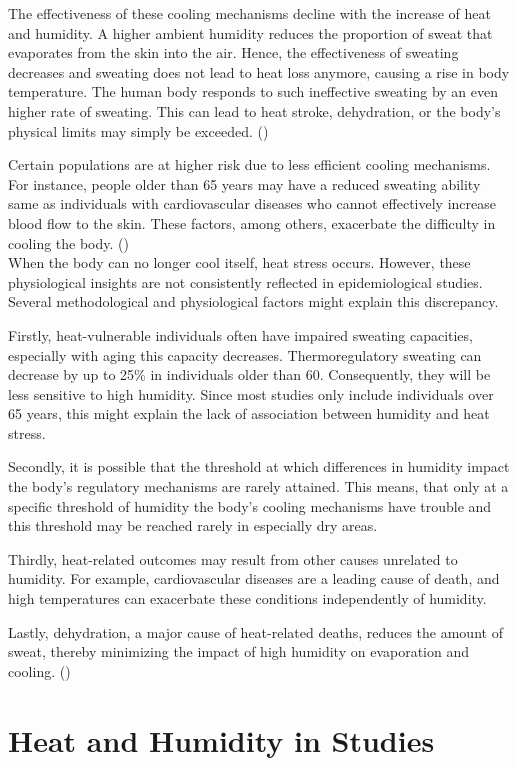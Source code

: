 \documentclass[
]{krantz}
\begin{document}
The effectiveness of these cooling mechanisms decline with the increase of heat and humidity. A higher ambient humidity reduces the proportion of sweat that evaporates from the skin into the air. Hence, the effectiveness of sweating decreases and sweating does not lead to heat loss anymore, causing a rise in body temperature. The human body responds to such ineffective sweating by an even higher rate of sweating. This can lead to heat stroke, dehydration, or the body's physical limits may simply be exceeded. (\citet{baldwin2023})

Certain populations are at higher risk due to less efficient cooling mechanisms. For instance, people older than 65 years may have a reduced sweating ability same as individuals with cardiovascular diseases who cannot effectively increase blood flow to the skin. These factors, among others, exacerbate the difficulty in cooling the body. (\citet{ebi2021})\\
When the body can no longer cool itself, heat stress occurs. However, these physiological insights are not consistently reflected in epidemiological studies. Several methodological and physiological factors might explain this discrepancy.

Firstly, heat-vulnerable individuals often have impaired sweating capacities, especially with aging this capacity decreases. Thermoregulatory sweating can decrease by up to 25\% in individuals older than 60. Consequently, they will be less sensitive to high humidity. Since most studies only include individuals over 65 years, this might explain the lack of association between humidity and heat stress.

Secondly, it is possible that the threshold at which differences in humidity impact the body's regulatory mechanisms are rarely attained. This means, that only at a specific threshold of humidity the body's cooling mechanisms have trouble and this threshold may be reached rarely in especially dry areas.

Thirdly, heat-related outcomes may result from other causes unrelated to humidity. For example, cardiovascular diseases are a leading cause of death, and high temperatures can exacerbate these conditions independently of humidity.

Lastly, dehydration, a major cause of heat-related deaths, reduces the amount of sweat, thereby minimizing the impact of high humidity on evaporation and cooling. (\citet{baldwin2023})

\section{Heat and Humidity in Studies}\label{heat-and-humidity-in-studies}
\end{document}
